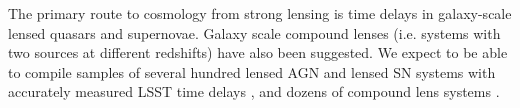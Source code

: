 %
%
%
%
%
%
%

\label{sec:sl_just}

The primary route to cosmology from strong lensing is time delays in
galaxy-scale lensed quasars and supernovae. Galaxy scale compound lenses
(i.e. systems with two sources at different redshifts) have also been
suggested. We expect to be able to compile samples of several hundred lensed AGN
and lensed SN systems with accurately measured LSST time delays \citep{LiaoEtal2015},
and dozens of compound lens systems \citep{Collett2015}.

